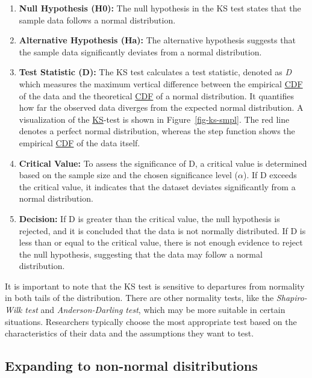 \documentclass[
  a4paper,
]{scrbook}
\begin{document}
\begin{enumerate}
\def\labelenumi{\arabic{enumi}.}
\item
  \textbf{Null Hypothesis (H0):} The null hypothesis in the KS test
  states that the sample data follows a normal distribution.
\item
  \textbf{Alternative Hypothesis (Ha):} The alternative hypothesis
  suggests that the sample data significantly deviates from a normal
  distribution.
\item
  \textbf{Test Statistic (D):} The KS test calculates a test statistic,
  denoted as \emph{D} which measures the maximum vertical difference
  between the empirical \hyperref[cdf]{CDF} of the data and the
  theoretical \hyperref[cdf]{CDF} of a normal distribution. It
  quantifies how far the observed data diverges from the expected normal
  distribution. A visualization of the \hyperref[KS]{KS}-test is shown
  in Figure~\ref{fig-ks-smpl}. The red line denotes a perfect normal
  distribution, whereas the step function shows the empirical
  \hyperref[cdf]{CDF} of the data itself.
\item
  \textbf{Critical Value:} To assess the significance of D, a critical
  value is determined based on the sample size and the chosen
  significance level (\(\alpha\)). If D exceeds the critical value, it
  indicates that the dataset deviates significantly from a normal
  distribution.
\item
  \textbf{Decision:} If D is greater than the critical value, the null
  hypothesis is rejected, and it is concluded that the data is not
  normally distributed. If D is less than or equal to the critical
  value, there is not enough evidence to reject the null hypothesis,
  suggesting that the data may follow a normal distribution.
\end{enumerate}

It is important to note that the KS test is sensitive to departures from
normality in both tails of the distribution. There are other normality
tests, like the \emph{Shapiro-Wilk test} and \emph{Anderson-Darling
test}, which may be more suitable in certain situations. Researchers
typically choose the most appropriate test based on the characteristics
of their data and the assumptions they want to test.

\subsection{Expanding to non-normal
disitributions}\label{expanding-to-non-normal-disitributions}
\end{document}
